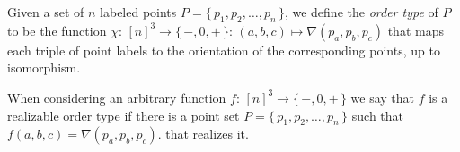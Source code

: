 \begin{definition}[name={Order Type of a Point Set},label={def:order-type}]
Given a set of \(n\) labeled points \(P = \{\, p_1, p_2, \ldots, p_n\,\}\), we
define the \emph{order type} of \(P\) to be the function
\(\chi \colon\, {[n]}^3 \to \{\, -, 0, +\,\}
\colon\, (a,b,c) \mapsto \nabla(p_a, p_b, p_c)\)
that maps each triple of point labels to the orientation of the corresponding
points, up to isomorphism.
\end{definition}
%
\begin{definition}[name={Realizable Order Type},label={def:realizable-order-type}]
When considering an arbitrary function \(f \colon\, {[n]}^3 \to \{\, -, 0,
+\,\}\) we say that \(f\) is a realizable order type if there is a point set
\(P = \{\, p_1, p_2, \ldots, p_n\,\}\)
such that
\(f(a,b,c) = \nabla(p_a, p_b, p_c)\).
that realizes it.
\end{definition}
